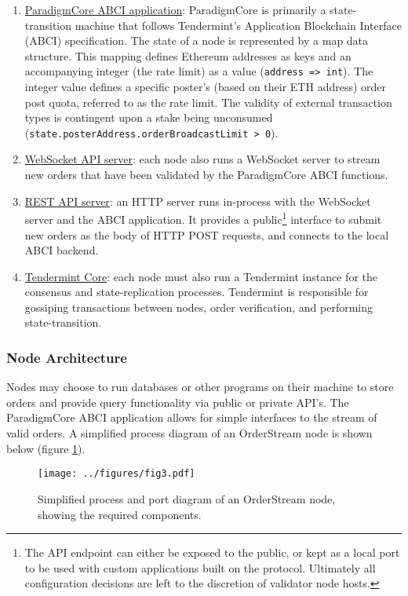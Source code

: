 \documentclass[9pt]{article}
\begin{document}
\begin{enumerate}
\item \underline{ParadigmCore ABCI application}: ParadigmCore is primarily a state-transition machine that follows Tendermint’s Application Blockchain Interface (ABCI) specification. The state of a node is represented by a map data structure. This mapping defines Ethereum addresses as keys and an accompanying integer (the rate limit) as a value (\texttt{address => int}). The integer value defines a specific poster’s (based on their ETH address) order post quota, referred to as the rate limit. The validity of external transaction types is contingent upon a stake being unconsumed (\texttt{state.posterAddress.orderBroadcastLimit > 0}).
\item \underline{WebSocket API server}: each node also runs a WebSocket server to stream new orders that have been validated by the ParadigmCore ABCI functions.
\item \underline{REST API server}: an HTTP server runs in-process with the WebSocket server and the ABCI application. It provides a public\footnote{The API endpoint can either be exposed to the public, or kept as a local port to be used with custom applications built on the protocol. Ultimately all configuration decisions are left to the discretion of validator node hosts.} interface to submit new orders as the body of HTTP POST requests, and connects to the local ABCI backend.
\item \underline{Tendermint Core}: each node must also run a Tendermint instance for the consensus and state-replication processes. Tendermint is responsible for gossiping transactions between nodes, order verification, and performing state-transition.
\end{enumerate} 

\subsubsection{Node Architecture}\label{node architecture}

\noindent Nodes may choose to run databases or other programs on their machine to store orders and provide query functionality via public or private API’s. The ParadigmCore ABCI application allows for simple interfaces to the stream of valid orders. A simplified process diagram of an OrderStream node is shown below (figure \ref{fig:fig3}).

\begin{figure}[H]
    \centering
    \texttt{[image: ../figures/fig3.pdf]}
    \caption{Simplified process and port diagram of an OrderStream node, showing the required components. }
    \label{fig:fig3}
\end{figure}
\end{document}
